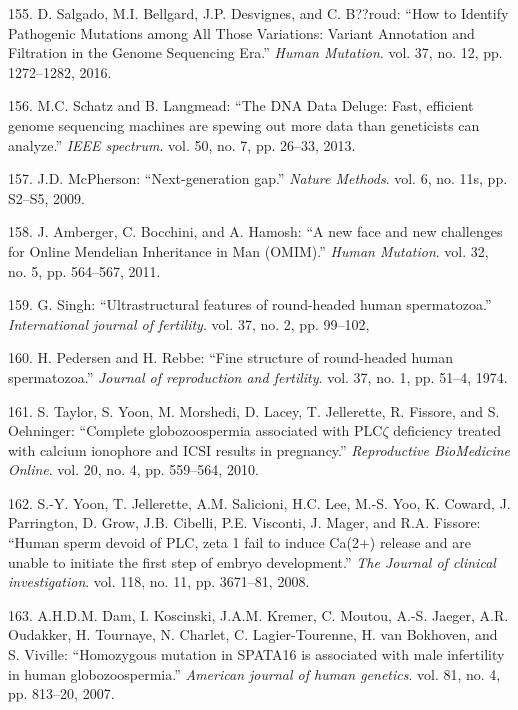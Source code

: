 \documentclass[12pt,twoside]{ugathesis}
\theoremstyle{definition}
\theoremstyle{definition}
\theoremstyle{remark}
\begin{document}
\hypertarget{ref-Salgado2016}{}
155. D. Salgado, M.I. Bellgard, J.P. Desvignes, and C. B??roud: ``How to
Identify Pathogenic Mutations among All Those Variations: Variant
Annotation and Filtration in the Genome Sequencing Era.'' \emph{Human
Mutation}. vol. 37, no. 12, pp. 1272--1282, 2016.

\hypertarget{ref-Schatz2013}{}
156. M.C. Schatz and B. Langmead: ``The DNA Data Deluge: Fast, efficient
genome sequencing machines are spewing out more data than geneticists
can analyze.'' \emph{IEEE spectrum}. vol. 50, no. 7, pp. 26--33, 2013.

\hypertarget{ref-McPherson2009}{}
157. J.D. McPherson: ``Next-generation gap.'' \emph{Nature Methods}.
vol. 6, no. 11s, pp. S2--S5, 2009.

\hypertarget{ref-Amberger2011}{}
158. J. Amberger, C. Bocchini, and A. Hamosh: ``A new face and new
challenges for Online Mendelian Inheritance in Man (OMIM).'' \emph{Human
Mutation}. vol. 32, no. 5, pp. 564--567, 2011.

\hypertarget{ref-Singh}{}
159. G. Singh: ``Ultrastructural features of round-headed human
spermatozoa.'' \emph{International journal of fertility}. vol. 37, no.
2, pp. 99--102,

\hypertarget{ref-Pedersen1974}{}
160. H. Pedersen and H. Rebbe: ``Fine structure of round-headed human
spermatozoa.'' \emph{Journal of reproduction and fertility}. vol. 37,
no. 1, pp. 51--4, 1974.

\hypertarget{ref-Taylor2010}{}
161. S. Taylor, S. Yoon, M. Morshedi, D. Lacey, T. Jellerette, R.
Fissore, and S. Oehninger: ``Complete globozoospermia associated with
PLC\(\zeta\) deficiency treated with calcium ionophore and ICSI results
in pregnancy.'' \emph{Reproductive BioMedicine Online}. vol. 20, no. 4,
pp. 559--564, 2010.

\hypertarget{ref-Yoon2008}{}
162. S.-Y. Yoon, T. Jellerette, A.M. Salicioni, H.C. Lee, M.-S. Yoo, K.
Coward, J. Parrington, D. Grow, J.B. Cibelli, P.E. Visconti, J. Mager,
and R.A. Fissore: ``Human sperm devoid of PLC, zeta 1 fail to induce
Ca(2+) release and are unable to initiate the first step of embryo
development.'' \emph{The Journal of clinical investigation}. vol. 118,
no. 11, pp. 3671--81, 2008.

\hypertarget{ref-Dam2007}{}
163. A.H.D.M. Dam, I. Koscinski, J.A.M. Kremer, C. Moutou, A.-S. Jaeger,
A.R. Oudakker, H. Tournaye, N. Charlet, C. Lagier-Tourenne, H. van
Bokhoven, and S. Viville: ``Homozygous mutation in SPATA16 is associated
with male infertility in human globozoospermia.'' \emph{American journal
of human genetics}. vol. 81, no. 4, pp. 813--20, 2007.
\end{document}
